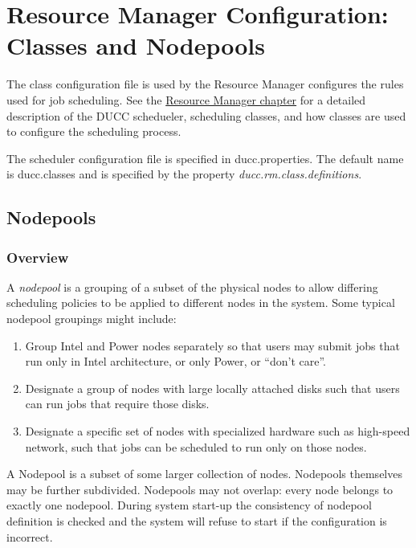 \section{Resource Manager Configuration: Classes and Nodepools}
\label{sec:ducc.classes}

The class configuration file is used by the Resource Manager configures the rules used for job
scheduling. See the \hyperref[chap:rm]{Resource Manager chapter} for a detailed description of the DUCC
schedueler, scheduling classes, and how classes are used to configure the scheduling process.

The scheduler  configuration file is specified in ducc.properties. The default name is 
ducc.classes and is specified by the property {\em ducc.rm.class.definitions}.
  
\subsection{Nodepools}
\label{subsec:nodepools}

\subsubsection{Overview}
    A {\em nodepool} is a grouping of a subset of the physical nodes to allow differing
    scheduling policies to be applied to different nodes in the system.  Some typical
    nodepool groupings might include:
    \begin{enumerate}
      \item Group Intel and Power nodes separately so that users may submit jobs that run
        only in Intel architecture, or only Power, or ``don't care''.
      \item Designate a group of nodes with large locally attached disks such that users
        can run jobs that require those disks.
      \item Designate a specific set of nodes with specialized hardware such as high-speed
        network, such that jobs can be scheduled to run only on those nodes.
    \end{enumerate}

    A Nodepool is a subset of some larger collection of nodes.  Nodepools themselves may be
    further subdivided.  Nodepools may not overlap: every node belongs to exactly
    one nodepool.  During system start-up the consistency of nodepool definition is checked
    and the system will refuse to start if the configuration is incorrect.

